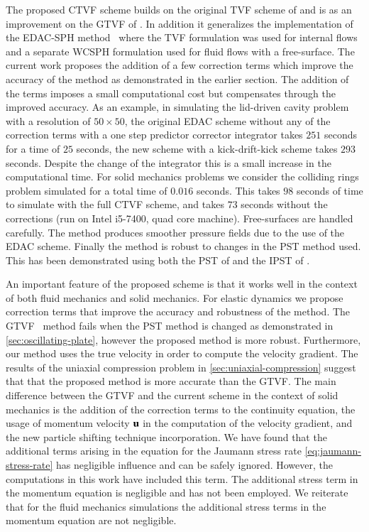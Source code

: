 The proposed CTVF scheme builds on the original TVF scheme of
\cite{Adami2013} and is as an improvement on the GTVF of
\cite{zhang_hu_adams17}. In addition it generalizes the implementation of the
EDAC-SPH method~\citep{edac-sph:cf:2019} where the TVF formulation was used for
internal flows and a separate WCSPH formulation used for fluid flows with a
free-surface. The current work proposes the addition of a few correction terms
which improve the accuracy of the method as demonstrated in the earlier
section. The addition of the terms imposes a small computational cost but
compensates through the improved accuracy. As an example, in simulating the
lid-driven cavity problem with a resolution of $50 \times 50$, the original
EDAC scheme without any of the correction terms with a one step predictor
corrector integrator takes $251$ seconds for a time of $25$ seconds, the new
scheme with a kick-drift-kick scheme takes $293$ seconds. Despite the change
of the integrator this is a small increase in the computational time. For solid
mechanics problems we consider the colliding rings problem simulated for a
total time of $0.016$ seconds. This takes $98$ seconds of time to simulate
with the full CTVF scheme, and takes $73$ seconds without the corrections (run
on Intel i5-7400, quad core machine). Free-surfaces are handled carefully.
The method produces smoother pressure fields due to the use of the EDAC
scheme. Finally the method is robust to changes in the PST method used. This
has been demonstrated using both the PST of \cite{sun_consistent_2019} and
the IPST of \cite{huang_kernel_2019}.

An important feature of the proposed scheme is that it works well in the
context of both fluid mechanics and solid mechanics. For elastic dynamics we
propose correction terms that improve the accuracy and robustness of the
method. The GTVF~\citep{zhang_hu_adams17} method fails when the PST method is
changed as demonstrated in \cref{sec:oscillating-plate}, however the proposed
method is more robust. Furthermore, our method uses the true velocity in order
to compute the velocity gradient. The results of the uniaxial compression
problem in \cref{sec:uniaxial-compression} suggest that that the proposed
method is more accurate than the GTVF. The main difference between the GTVF
and the current scheme in the context of solid mechanics is the addition of
the correction terms to the continuity equation, the usage of momentum
velocity $\mathbf{u}$ in the computation of the velocity gradient, and the new
particle shifting technique incorporation. We have found that the additional
terms arising in the equation for the Jaumann stress rate
\cref{eq:jaumann-stress-rate} has negligible influence and can be safely
ignored. However, the computations in this work have included this term. The
additional stress term in the momentum equation is negligible and has not been
employed. We reiterate that for the fluid mechanics simulations the additional
stress terms in the momentum equation are not negligible.

